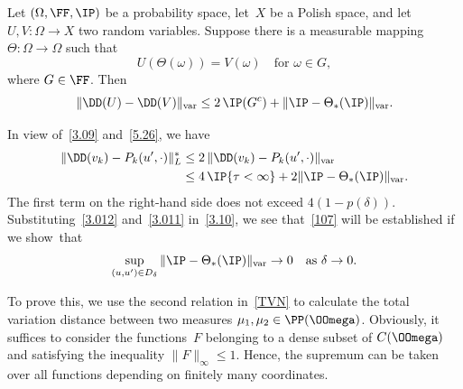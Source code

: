 \begin{lemma} \label{l5.4}
Let $(\Omega,\FF,\IP)$ be a probability space, let~$X$ be a Polish space, and let~$U,V:\Omega\to X$ two random variables. Suppose there is a measurable mapping $\Theta:\Omega\to\Omega$ such that\vspace*{-3pt}
\begin{equation} \label{5.25}
U(\Theta(\omega))=V(\omega)\quad\text{for $\omega\in G$},
\end{equation}
where $G\in\FF$. Then\vspace*{-3pt}
\begin{equation} \label{5.26}
\|\DD(U)-\DD(V)\|_{\mathrm{var}}
\le 2\,\IP(G^c)+\|\IP-\Theta_*(\IP)\|_{\mathrm{var}}.
\end{equation}
\end{lemma}

In view of~\eqref{3.09} and~\eqref{5.26}, we have
\begin{equation}
\begin{aligned}
\|\DD(v_k)-P_k(u',\cdot)\|_L^*
&\le 2\,\|\DD(v_k)-P_k(u',\cdot)\|_{\mathrm{var}}\\
&\le 4\,\IP\{\tau<\infty\}+2\|\IP-\Theta_*(\IP)\|_{\mathrm{var}}.
\label{3.012}
\end{aligned}
\end{equation}
The first term on the right-hand side does not exceed $4(1-p(\delta))$. Substituting~\eqref{3.012} and~\eqref{3.011} in~\eqref{3.10}, we see that~\eqref{107} will be established if we show~that
\begin{equation} \label{1.15}
\sup_{(u,u')\in D_\delta}
\|\IP-\Theta_*(\IP)\|_{\mathrm{var}}\to0\quad\text{as $\delta\to0$}.
\end{equation}

To prove this, we use the second relation in~\eqref{TVN} to calculate the total variation distance between two measures $\mu_1,\mu_2\in\PP(\OOmega)$. Obviously, it suffices to consider the functions~$F$ belonging to a dense subset of $C(\OOmega)$ and satisfying the inequality $\|F\|_\infty\le 1$. Hence, the supremum can be taken over all functions depending on finitely many coordinates.

